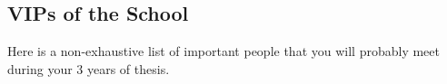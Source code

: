 \subsection{VIPs of the School}
Here is a non-exhaustive list of important people that you will probably meet during your 3 years of thesis.

\newcommand{\largcolp}{0.2\textwidth}
\newcommand{\largcol}{0.7\textwidth}

\newcommand{\pers}[4]{%
\begin{tabular}{m{\largcolp}}
\\
\ifthenelse{\equal{#1}{}}{~\vspace*{2.2cm}}{\raisebox{-.5\height}{\texttt{[image: images/\#1]}}}
\\~
\end{tabular} &
\begin{tabular}{m{\largcol}}
\textbf{#2} \\ \textit{(#3)} \\ #4
\end{tabular}\\\hline}

